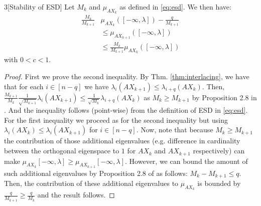 \documentclass[12pt,conference,compsocconf]{IEEEtran}
\begin{document}
\begin{customcorollary}{3}[Stability of ESD]\label{thm:stabilityesd}
Let $M_k$ and $\mu_{AX_k}$ as defined in \ref{eq:esd}. We then have:
\begin{align}\label{eq:stabilityofESD}
	\frac{M_k}{M_{k+1}}&\mu_{AX_k}([-\infty,\lambda])-\frac{q}{M_{k+1}}\\ \nonumber
    &\leq \mu_{AX_{k+1}}([-		 \infty,\lambda])\\ \nonumber
    &\leq \frac{M_{k}}{M_{k+1}}\mu_{AX_k}([-\infty,\lambda]) \nonumber
\end{align}
with $0<c<1$.
\begin{proof}
First we prove the second inequality. By Thm. \ref{thm:interlacing}, we have that for each $i \in [n-q]$ we have $\lambda_i(AX_{k+1}) \leq \lambda_{i+q}(AX_k)$. Then, $\frac{M_{k+1}}{M_k} \frac{1}{\sqrt{M_{k+1}}} \lambda_i(AX_{k+1}) \leq \frac{1}{\sqrt{M_{k}}} \lambda_{i+q}(AX_k)$ as $M_k\geq M_{k+1}$ by Proposition 2.8 in \cite{Gratton}. And the inequality follows (point-wise) from the definition of ESD in \ref{eq:esd}.\\
For the first inequality we proceed as for the second inequality but using $\lambda_i(AX_k) \leq \lambda_i(AX_{k+1}) $ for $i \in [n-q]$. Now, note that because $M_k\geq M_{k+1}$ the contribution of those additional eigenvalues (e.g. difference in cardinality between the orthogonal eigenspace to $1$ for $AX_k$ and $AX_{k+1}$ respectively) can make $\mu_{AX_k}[-\infty,\lambda]\geq \mu_{AX_{k+1}}[-\infty,\lambda]$. However, we can bound the amount of such additional eigenvalues by Proposition 2.8 of \cite{Gratton} as follows: $M_k - M_{k+1} \leq q$. Then, the contribution of these additional eigenvalues to $\mu_{AX_k}$ is bounded by $\frac{q}{M_{k+1}}\geq \frac{q}{M_k}$ and the result follows.
\end{proof}
\end{customcorollary}
\end{document}
